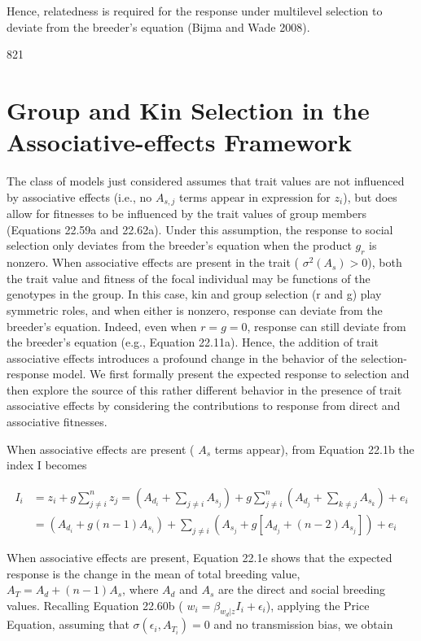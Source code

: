 \documentclass{article}
\begin{document}
Hence, relatedness is required for the response under multilevel selection to deviate from the breeder's equation (Bijma and Wade 2008).

821

\section{Group and Kin Selection in the Associative-effects Framework}
The class of models just considered assumes that trait values are not influenced by associative effects (i.e., no  $ A_{s,j} $ terms appear in expression for  $ z_i $), but does allow for fitnesses to be influenced by the trait values of group members (Equations 22.59a and 22.62a). Under this assumption, the response to social selection only deviates from the breeder's equation when the product  $ g_r $ is nonzero. When associative effects are present in the trait ( $ \sigma^2(A_s) > 0 $), both the trait value and fitness of the focal individual may be functions of the genotypes in the group. In this case, kin and group selection (r and g) play symmetric roles, and when either is nonzero, response can deviate from the breeder's equation. Indeed, even when  $ r = g = 0 $, response can still deviate from the breeder's equation (e.g., Equation 22.11a). Hence, the addition of trait associative effects introduces a profound change in the behavior of the selection-response model. We first formally present the expected response to selection and then explore the source of this rather different behavior in the presence of trait associative effects by considering the contributions to response from direct and associative fitnesses.

When associative effects are present ( $ A_{s} $ terms appear), from Equation 22.1b the index I becomes

\begin{equation}
\begin{aligned}I_{i}&=z_{i}+g\sum_{j\neq i}^{n}z_{j}=\left(A_{d_{i}}+\sum_{j\neq i}A_{s_{j}}\right)+g\sum_{j\neq i}^{n}\left(A_{d_{j}}+\sum_{k\neq j}A_{s_{k}}\right)+e_{i}\\&=\left(A_{d_{i}}+g(n-1)A_{s_{i}}\right)+\sum_{j\neq i}\left(A_{s_{j}}+g\left[A_{d_{j}}+(n-2)A_{s_{j}}\right]\right)+e_{i}\end{aligned}
\tag{22.66}
\label{eq:22_66}
\end{equation}

When associative effects are present, Equation 22.1e shows that the expected response is the change in the mean of total breeding value,  $ A_T = A_d + (n - 1)A_s $, where  $ A_d $ and  $ A_s $ are the direct and social breeding values. Recalling Equation 22.60b ( $ w_i = \beta_{w_d|z}I_i + \epsilon_i $), applying the Price Equation, assuming that  $ \sigma(\epsilon_i, A_{T_i}) = 0 $ and no transmission bias, we obtain
\end{document}
